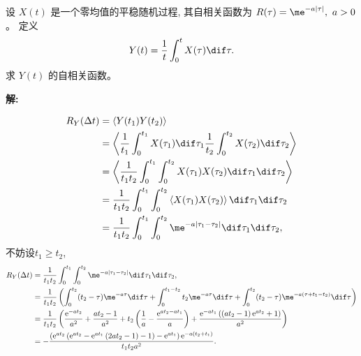 \documentclass[12pt,a4]{ctexart}
\begin{document}
设 $X(t)$ 是一个零均值的平稳随机过程, 其自相关函数为 $R(\tau)=\me^{-a|\tau|},\ a>0$。 定义
\begin{equation}
	Y(t)=\frac{1}{t} \int_{0}^{t} X(\tau) \dif \tau.
\end{equation}
求 $Y(t)$ 的自相关函数。

\textsf{\hspace{-2em}\sf  \textbf{解:}}

\begin{equation}
	\begin{aligned}
		R_Y(\Delta t) & = \left\langle Y(t_1)Y(t_2)\right\rangle                                                                                          \\
					  & = \left\langle \frac{1}{t_1} \int_{0}^{t_1} X(\tau_1) \dif \tau_1 \frac{1}{t_2} \int_{0}^{t_2} X(\tau_2) \dif \tau_2\right\rangle \\
					  & = \left\langle \frac{1}{t_1 t_2} \int_{0}^{t_1} \int_{0}^{t_2} X(\tau_1)   X(\tau_2) \dif \tau_1 \dif \tau_2\right\rangle         \\
					  & = \frac{1}{t_1 t_2} \int_{0}^{t_1} \int_{0}^{t_2}\left\langle  X(\tau_1)   X(\tau_2) \right\rangle \dif \tau_1 \dif \tau_2        \\
					  & = \frac{1}{t_1 t_2} \int_{0}^{t_1} \int_{0}^{t_2} \me^{-a|\tau_1-\tau_2|} \dif \tau_1 \dif \tau_2,                                \\
	\end{aligned}
\end{equation}
不妨设$t_1 \geqslant t_2$,
\begin{equation}
	\begin{aligned}
		R_Y(\Delta t) & = \frac{1}{t_1 t_2} \int_{0}^{t_1} \int_{0}^{t_2} \me^{-a|\tau_1-\tau_2|} \dif \tau_1 \dif \tau_2,                                                                                                                                            \\
					  & = \frac{1}{t_1 t_2} \left(\int^{t_2}_0 (t_2 - \tau) \me^{-a \tau} \dif \tau +  \int^{t_1 - t_2}_0 t_2 \me^{-a \tau} \dif \tau +  \int^{t_2}_0 (t_2 - \tau) \me^{-a (\tau+t_1-t_2)} \dif \tau   \right)                                        \\
					  & = \frac{1}{t_1 t_2} \left( \dfrac{\mathrm{e}^{-at_2}}{a^2}+\dfrac{at_2-1}{a^2} + t_2\left(\dfrac{1}{a}-\dfrac{\mathrm{e}^{at_2-at_1}}{a}\right) +  \dfrac{\mathrm{e}^{-at_1}\left(\left(at_2-1\right)\mathrm{e}^{at_2}+1\right)}{a^2} \right) \\
					  & = -\dfrac{\left(\mathrm{e}^{at_2}\left(\mathrm{e}^{at_2}-\mathrm{e}^{at_1}\left(2at_2-1\right)-1\right)-\mathrm{e}^{at_1}\right)\mathrm{e}^{-a\left(t_2+t_1\right)}}{t_1 t_2 a^2}.
	\end{aligned}
\end{equation}
\end{document}

